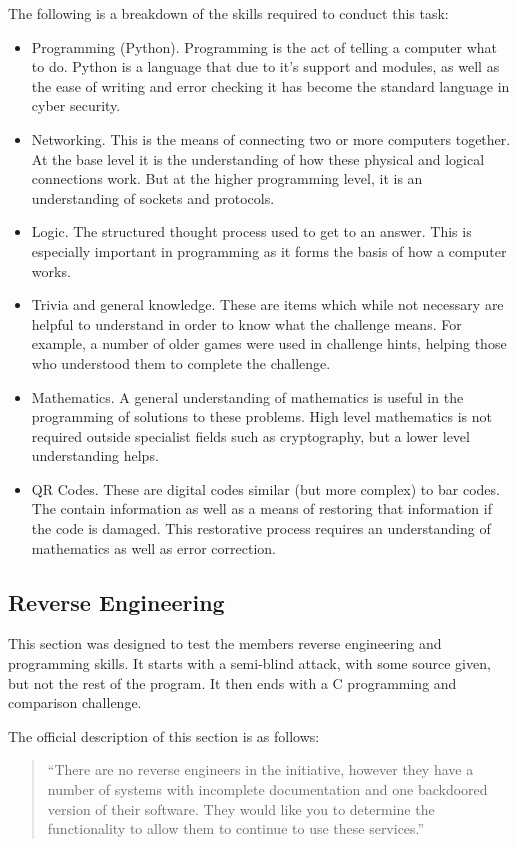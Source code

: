 \documentclass[a4paper,11pt]{report}
\begin{document}
			The following is a breakdown of the skills required to conduct this task:
			\begin{itemize}
				\item Programming (Python).
					Programming is the act of telling a computer what to do. 
					Python is a language that due to it's support and modules, as well as the ease of writing and error checking it has become the standard language in cyber security. 
				\item Networking.
					This is the means of connecting two or more computers together. 
					At the base level it is the understanding of how these physical and logical connections work. 
					But at the higher programming level, it is an understanding of sockets and protocols. 
				\item Logic.
					The structured thought process used to get to an answer. 
					This is especially important in programming as it forms the basis of how a computer works. 
				\item Trivia and general knowledge. 
					These are items which while not necessary are helpful to understand in order to know what the challenge means. 
					For example, a number of older games were used in challenge hints, helping those who understood them to complete the challenge. 
				\item Mathematics. 
					A general understanding of mathematics is useful in the programming of solutions to these problems. 
					High level mathematics is not required outside specialist fields such as cryptography, but a lower level understanding helps. 
				\item QR Codes.
					These are digital codes similar (but more complex) to bar codes.
					The contain information as well as a means of restoring that information if the code is damaged. 
					This restorative process requires an understanding of mathematics as well as error correction. 
			\end{itemize}

		\subsection{Reverse Engineering}
			This section was designed to test the members reverse engineering and programming skills. 
			It starts with a semi-blind attack, with some source given, but not the rest of the program. 
			It then ends with a C programming and comparison challenge. 
			
			The official description of this section is as follows:
			\begin{quote}
				``There are no reverse engineers in the initiative, however they have a number of systems with incomplete documentation and one backdoored version of their software. They would like you to determine the functionality to allow them to continue to use these services.''
			\end{quote}
\end{document}
